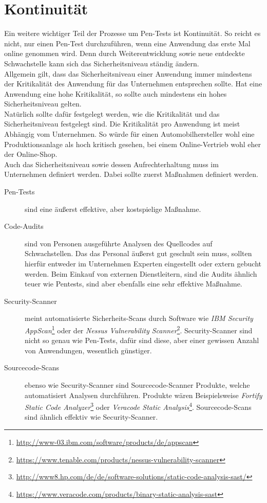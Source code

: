\section{Kontinuität}
Ein weitere wichtiger Teil der Prozesse um Pen-Tests ist Kontinuität. So reicht es nicht, nur einen Pen-Test durchzuführen, wenn eine Anwendung das erste Mal online genommen wird. Denn durch Weiterentwicklung sowie neue entdeckte Schwachstelle kann sich das Sicherheitsniveau ständig ändern.\\

Allgemein gilt, dass das Sicherheitsniveau einer Anwendung immer mindestens der Kritikalität des Anwendung für das Unternehmen entsprechen sollte. Hat eine Anwendung eine hohe Kritikalität, so sollte auch mindestens ein hohes Sicherheitsniveau gelten.\\

Natürlich sollte dafür festgelegt werden, wie die Kritikalität und das Sicherheitsniveau festgelegt sind. Die Kritikalität pro Anwendung ist meist Abhängig vom Unternehmen. So würde für einen Automobilhersteller wohl eine Produktionsanlage als hoch kritisch gesehen, bei einem Online-Vertrieb wohl eher der Online-Shop.\\

Auch das Sicherheitsniveau sowie dessen Aufrechterhaltung muss im Unternehmen definiert werden. Dabei sollte zuerst Maßnahmen definiert werden. 

\begin{description}
	\item[Pen-Tests] sind eine äußerst effektive, aber kostspielige Maßnahme.
	
		\item[Code-Audits] sind von Personen ausgeführte Analysen des Quellcodes auf Schwachstellen. Das das Personal äußerst gut geschult sein muss, sollten hierfür entweder im Unternehmen Experten eingestellt oder extern gebucht werden. Beim Einkauf von externen Dienstleitern, sind die Audits ähnlich teuer wie Pentests, sind aber ebenfalls eine sehr effektive Maßnahme.
	
	\item[Security-Scanner] meint automatisierte Sicherheits-Scans durch Software wie \textit{IBM Security AppScan}\footnote{\url{http://www-03.ibm.com/software/products/de/appscan}} oder der \textit{Nessus Vulnerability Scanner}\footnote{\url{https://www.tenable.com/products/nessus-vulnerability-scanner}}. Security-Scanner sind nicht so genau wie Pen-Tests, dafür sind diese, aber einer gewissen Anzahl von Anwendungen, wesentlich günstiger.
	
	\item[Sourcecode-Scans] ebenso wie Security-Scanner sind Sourcecode-Scanner Produkte, welche automatisiert Analysen durchführen. Produkte wären Beispielsweise \textit{Fortify Static Code Analyzer}\footnote{\url{http://www8.hp.com/de/de/software-solutions/static-code-analysis-sast/}} oder \textit{Veracode Static Analysis}\footnote{\url{https://www.veracode.com/products/binary-static-analysis-sast}}. Sourcecode-Scans sind ähnlich effektiv wie Security-Scanner.
	
\end{description}
 
